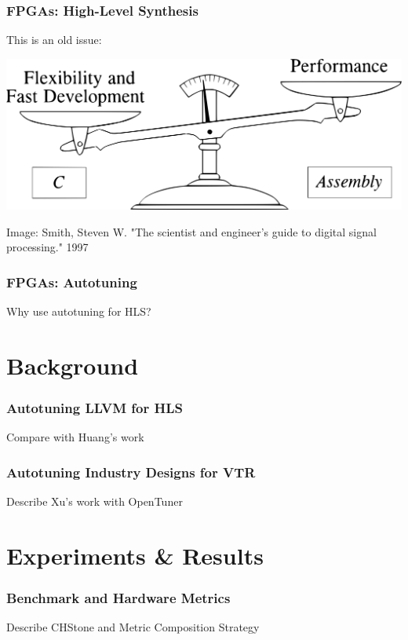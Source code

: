 \documentclass[10pt, compress, aspectratio=169]{beamer}
\begin{document}
\begin{frame}
    \frametitle{FPGAs: High-Level Synthesis}
    \begin{block}{This is an \alert{old issue}:}
    \begin{center}
        \includegraphics[width=.74\textwidth]{tradeoff_software}

        \scriptsize{Image: Smith, Steven W. "The scientist and engineer's guide
        to digital signal processing." 1997}
    \end{center}
    \end{block}
\end{frame}

\begin{frame}
    \frametitle{FPGAs: Autotuning}
    \begin{block}{Why use autotuning for HLS?}
    \end{block}
\end{frame}

\section{Background}

\begin{frame}
    \frametitle{Autotuning LLVM for HLS}
    \begin{block}{Compare with Huang's work}
    \end{block}
\end{frame}

\begin{frame}
    \frametitle{Autotuning Industry Designs for VTR}
    \begin{block}{Describe Xu's work with OpenTuner}
    \end{block}
\end{frame}

\section{Experiments \& Results}

\begin{frame}
    \frametitle{Benchmark and Hardware Metrics}
    \begin{block}{Describe CHStone and Metric Composition Strategy}
    \end{block}
\end{frame}
\end{document}
